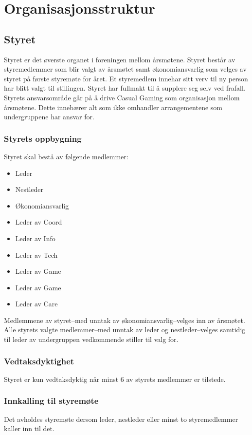 \chapter{Organisasjonsstruktur}

\section{Styret}
Styret er det øverste organet i foreningen mellom årsmøtene. Styret består av styremedlemmer som blir valgt av årsmøtet samt økonomiansvarlig som velges av styret på første styremøte for året. Et styremedlem innehar sitt verv til ny person har blitt valgt til stillingen. Styret har fullmakt til å supplere seg selv ved frafall. Styrets ansvarsområde går på å drive Casual Gaming som organisasjon mellom årsmøtene. Dette innebærer alt som ikke omhandler arrangementene som undergruppene har ansvar for.

\subsection{Styrets oppbygning}
Styret skal bestå av følgende medlemmer:
\begin{itemize}
    \item Leder
    \item Nestleder
    \item Økonomiansvarlig
    \item Leder av Coord
    \item Leder av Info
    \item Leder av Tech
    \item Leder av Game
    \item Leder av Game
    \item Leder av Care
\end{itemize}

Medlemmene av styret–med unntak av økonomiansvarlig–velges inn av årsmøtet. Alle styrets valgte medlemmer–med unntak av leder og nestleder–velges samtidig til leder av undergruppen vedkommende stiller til valg for.

\subsection{Vedtaksdyktighet}
Styret er kun vedtaksdyktig når minst 6 av styrets medlemmer er tilstede.

\subsection{Innkalling til styremøte}
Det avholdes styremøte dersom leder, nestleder eller minst to styremedlemmer kaller inn til det.

